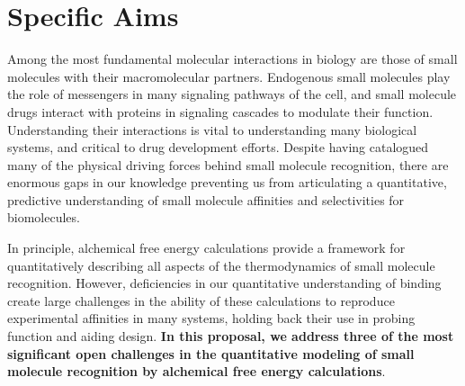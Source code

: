\documentclass[10pt,final]{article}
\date{}
\begin{document}
\newpage
\section*{\centering Specific Aims}
Among the most fundamental molecular interactions in biology are those of small molecules with their macromolecular partners.
Endogenous small molecules play the role of messengers in many signaling pathways of the cell, and small molecule drugs interact with proteins in signaling cascades to modulate their function.
Understanding their interactions is vital to understanding many biological systems, and critical to drug development efforts.
Despite having catalogued many of the physical driving forces behind small molecule recognition, there are enormous gaps in our knowledge preventing us from articulating a quantitative, predictive understanding of small molecule affinities and selectivities for biomolecules.

In principle, alchemical free energy calculations provide a framework for quantitatively describing all aspects of the thermodynamics of small molecule recognition. 
However, deficiencies in our quantitative understanding of binding create large challenges in the ability of these calculations to reproduce experimental affinities in many systems, holding back their use in probing function and aiding design.
\textbf{In this proposal, we address three of the most significant open challenges in the quantitative modeling of small molecule recognition by alchemical free energy calculations}.
\end{document}

